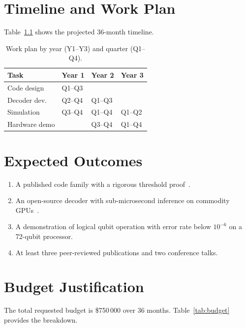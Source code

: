 \documentclass[
    language=english,
    doctype=research-proposal,
    institution=none,
    titlestyle=book,
]{../../omnilatex}
\begin{document}
\chapter{Timeline and Work Plan}
Table~\ref{tab:gantt} shows the projected 36-month timeline.

\begin{table}[htbp]
    \centering
    \caption{Work plan by year (Y1--Y3) and quarter (Q1--Q4).}
    \label{tab:gantt}
    \begin{tabular}{@{}llll@{}}
        \toprule
        Task & Year 1 & Year 2 & Year 3 \\
        \midrule
        Code design   & Q1--Q3 &        &        \\
        Decoder dev.  & Q2--Q4 & Q1--Q3 &        \\
        Simulation    & Q3--Q4 & Q1--Q4 & Q1--Q2 \\
        Hardware demo &        & Q3--Q4 & Q1--Q4 \\
        \bottomrule
    \end{tabular}
\end{table}

\chapter{Expected Outcomes}
\begin{enumerate}
    \item A published code family with a rigorous threshold
          proof~\cite{knuthTeXbook1986}.
    \item An open-source decoder with sub-microsecond inference on commodity
          GPUs~\cite{mckinneyPythonDataAnalysis2018}.
    \item A demonstration of logical qubit operation with error rate below
          $10^{-6}$ on a 72-qubit processor.
    \item At least three peer-reviewed publications and two conference talks.
\end{enumerate}

\chapter{Budget Justification}
The total requested budget is \$750\,000 over 36 months.
Table~\ref{tab:budget} provides the breakdown.
\end{document}
